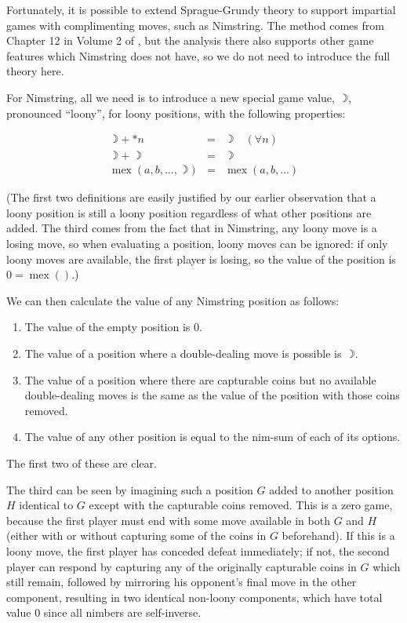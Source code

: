 \documentclass[a4paper,twocolumn]{article}
\DeclareMathOperator{\mex}{mex}
\newcommand{\loony}{\rightmoon}
\begin{document}
Fortunately, it is possible to extend Sprague-Grundy theory to support
impartial games with complimenting moves, such as Nimstring. The
method comes from Chapter 12 in Volume 2 of \cite{wways}, but the
analysis there also supports other game features which Nimstring does
not have, so we do not need to introduce the full theory here.

For Nimstring, all we need is to introduce a new special game value,
$\loony$, pronounced ``loony'', for loony positions, with the
following properties:

\begin{eqnarray*}
  \loony + *n & = & \loony \quad (\forall n)\\
  \loony + \loony & = & \loony \\
  \mex(a, b, \ldots, \loony) & = & \mex(a, b, \ldots)
\end{eqnarray*}

(The first two definitions are easily justified by our earlier
observation that a loony position is still a loony position regardless
of what other positions are added. The third comes from the fact that
in Nimstring, any loony move is a losing move, so when evaluating a
position, loony moves can be ignored: if only loony moves are
available, the first player is losing, so the value of the position is
$0 = \mex()$.)

We can then calculate the value of any Nimstring position as follows:

\begin{enumerate}
  \item The value of the empty position is $0$.
  \item The value of a position where a double-dealing move is
    possible is $\loony$.
  \item The value of a position where there are capturable coins but
    no available double-dealing moves is the same as the value of the
    position with those coins removed.
  \item The value of any other position is equal to the nim-sum of
    each of its options.
\end{enumerate}

The first two of these are clear.

The third can be seen by imagining such a position $G$ added to
another position $H$ identical to $G$ except with the capturable coins
removed. This is a zero game, because the first player must end with
some move available in both $G$ and $H$ (either with or without
capturing some of the coins in $G$ beforehand). If this is a loony
move, the first player has conceded defeat immediately; if not, the
second player can respond by capturing any of the originally
capturable coins in $G$ which still remain, followed by mirroring his
opponent's final move in the other component, resulting in two
identical non-loony components, which have total value $0$ since all
nimbers are self-inverse.
\end{document}
